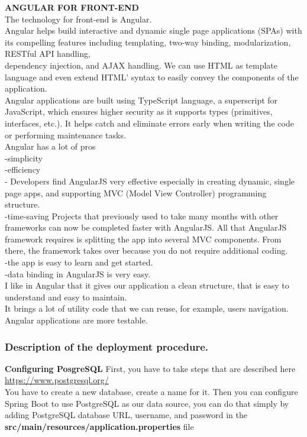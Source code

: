 \documentclass{scrartcl}
\begin{document}
\textbf{ANGULAR FOR FRONT-END} \\
The technology for front-end is Angular.\\
Angular helps build interactive and dynamic single page applications (SPAs) with its compelling features including templating, two-way binding, modularization, RESTful API handling,\\ dependency injection, and AJAX handling. We can use HTML as template language and even extend HTML’ syntax to easily convey the components of the application.\\
Angular applications are built using TypeScript language, a superscript for JavaScript, which ensures higher security as it supports types (primitives, interfaces, etc.). It helps catch and eliminate errors early when writing the code or performing maintenance tasks.\\
Angular has a lot of pros\\
-simplicity\\
-efficiency\\
- Developers find AngularJS very effective especially in creating dynamic, single page apps, and supporting MVC (Model View Controller) programming structure.\\
-time-saving Projects that previously used to take many months with other frameworks can now be completed faster with AngularJS. All that AngularJS framework requires is splitting the app into several MVC components. From there, the framework takes over because you do not require additional coding.\\
-the app is easy to learn and get started.\\
-data binding in AngularJS is very easy.\\
I like in Angular that it gives our application a clean structure, that is easy to understand and easy to maintain.\\
It brings a lot of utility code that we can reuse, for example, users navigation. Angular applications are more testable.\\

\subsubsection{Description of the deployment procedure.}
\textbf{Configuring PosgreSQL}
First, you have to take steps that are described here \url{ https://www.postgresql.org/}\\ You have to create a new database, create a name for it.
 Then you can configure Spring Boot to use PostgreSQL as our data source, you can do that simply by adding PostgreSQL database URL, username, and password in the \textbf{src/main/resources/application.properties} file \\
 
\end{document}
